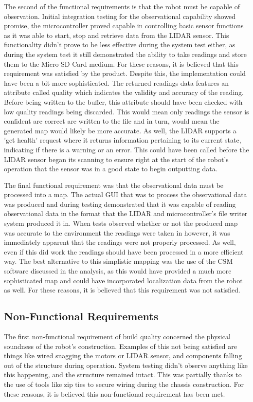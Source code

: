 		The second of the functional requirements is that the robot must be capable of observation. Initial integration testing for the observational capability showed promise, the microcontroller proved capable in controlling basic sensor functions as it was able to start, stop and retrieve data from the LIDAR sensor. This functionality didn't prove to be less effective during the system test either, as during the system test it still demonstrated the ability to take readings and store them to the Micro-SD Card medium. For these reasons, it is believed that this requirement was satisfied by the product. Despite this, the implementation could have been a bit more sophisticated. The returned readings data features an attribute called quality which indicates the validity and accuracy of the reading. Before being written to the buffer, this attribute should have been checked with low quality readings being discarded. This would mean only readings the sensor is confident are correct are written to the file and in turn, would mean the generated map would likely be more accurate. As well, the LIDAR supports a 'get health' request where it returns information pertaining to its current state, indicating if there is a warning or an error. This could have been called before the LIDAR sensor began its scanning to ensure right at the start of the robot's operation that the sensor was in a good state to begin outputting data.
		
		The final functional requirement was that the observational data must be processed into a map. The actual GUI that was to process the observational data was produced and during testing demonstrated that it was capable of reading observational data in the format that the LIDAR and microcontroller's file writer system produced it in. When tests observed whether or not the produced map was accurate to the environment the readings were taken in however, it was immediately apparent that the readings were not properly processed. As well, even if this did work the readings should have been processed in a more efficient way. The best alternative to this simplistic mapping was the use of the CSM software discussed in the analysis, as this would have provided a much more sophisticated map and could have incorporated localization data from the robot as well. For these reasons, it is believed that this requirement was not satisfied.
	
		\subsection{Non-Functional Requirements}
		The first non-functional requirement of build quality concerned the physical soundness of the robot's construction. Examples of this not being satisfied are things like wired snagging the motors or LIDAR sensor, and components falling out of the structure during operation. System testing didn't observe anything like this happening, and the structure remained intact. This was partially thanks to the use of tools like zip ties to secure wiring during the chassis construction. For these reasons, it is believed this non-functional requirement has been met.
		

